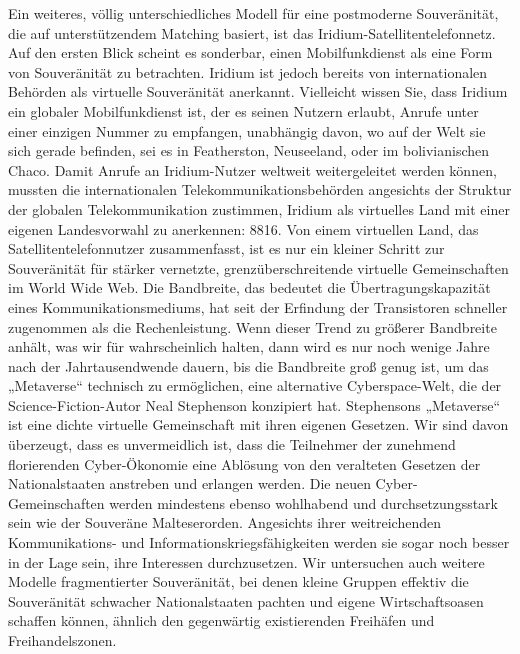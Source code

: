 \documentclass[
  a5paper,
  smalldemyvopaper,10pt,twoside,onecolumn,openright,extrafontsizes,hidelinks]{memoir}
\begin{document}
Ein weiteres, völlig unterschiedliches Modell für eine postmoderne
Souveränität, die auf unterstützendem Matching basiert, ist das
Iridium-Satellitentelefonnetz. Auf den ersten Blick scheint es
sonderbar, einen Mobilfunkdienst als eine Form von Souveränität zu
betrachten. Iridium ist jedoch bereits von internationalen Behörden als
virtuelle Souveränität anerkannt. Vielleicht wissen Sie, dass Iridium
ein globaler Mobilfunkdienst ist, der es seinen Nutzern erlaubt, Anrufe
unter einer einzigen Nummer zu empfangen, unabhängig davon, wo auf der
Welt sie sich gerade befinden, sei es in Featherston, Neuseeland, oder
im bolivianischen Chaco. Damit Anrufe an Iridium-Nutzer weltweit
weitergeleitet werden können, mussten die internationalen
Telekommunikationsbehörden angesichts der Struktur der globalen
Telekommunikation zustimmen, Iridium als virtuelles Land mit einer
eigenen Landesvorwahl zu anerkennen: 8816. Von einem virtuellen Land,
das Satellitentelefonnutzer zusammenfasst, ist es nur ein kleiner
Schritt zur Souveränität für stärker vernetzte, grenzüberschreitende
virtuelle Gemeinschaften im World Wide Web. Die Bandbreite, das bedeutet
die Übertragungskapazität eines Kommunikationsmediums, hat seit der
Erfindung der Transistoren schneller zugenommen als die Rechenleistung.
Wenn dieser Trend zu größerer Bandbreite anhält, was wir für
wahrscheinlich halten, dann wird es nur noch wenige Jahre nach der
Jahrtausendwende dauern, bis die Bandbreite groß genug ist, um das
„Metaverse`` technisch zu ermöglichen, eine alternative Cyberspace-Welt,
die der Science-Fiction-Autor Neal Stephenson konzipiert hat.
Stephensons „Metaverse`` ist eine dichte virtuelle Gemeinschaft mit
ihren eigenen Gesetzen. Wir sind davon überzeugt, dass es unvermeidlich
ist, dass die Teilnehmer der zunehmend florierenden Cyber-Ökonomie eine
Ablösung von den veralteten Gesetzen der Nationalstaaten anstreben und
erlangen werden. Die neuen Cyber-Gemeinschaften werden mindestens ebenso
wohlhabend und durchsetzungsstark sein wie der Souveräne Malteserorden.
Angesichts ihrer weitreichenden Kommunikations- und
Informationskriegsfähigkeiten werden sie sogar noch besser in der Lage
sein, ihre Interessen durchzusetzen. Wir untersuchen auch weitere
Modelle fragmentierter Souveränität, bei denen kleine Gruppen effektiv
die Souveränität schwacher Nationalstaaten pachten und eigene
Wirtschaftsoasen schaffen können, ähnlich den gegenwärtig existierenden
Freihäfen und Freihandelszonen.
\end{document}

